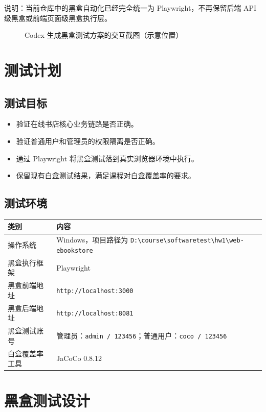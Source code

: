 \documentclass[UTF8,a4paper,12pt]{ctexart}
\begin{document}
说明：当前仓库中的黑盒自动化已经完全统一为 Playwright，不再保留后端 API 级黑盒或前端页面级黑盒执行层。

\begin{figure}[H]
  \centering
  \caption{Codex 生成黑盒测试方案的交互截图（示意位置）}
\end{figure}

\section{测试计划}

\subsection{测试目标}

\begin{itemize}
  \item 验证在线书店核心业务链路是否正确。
  \item 验证普通用户和管理员的权限隔离是否正确。
  \item 通过 Playwright 将黑盒测试落到真实浏览器环境中执行。
  \item 保留现有白盒测试结果，满足课程对白盒覆盖率的要求。
\end{itemize}

\subsection{测试环境}

\begin{longtable}{p{4cm}p{10cm}}
\toprule
类别 & 内容 \\
\midrule
操作系统 & Windows，项目路径为 \texttt{D:\textbackslash course\textbackslash softwaretest\textbackslash hw1\textbackslash web-ebookstore} \\
黑盒执行框架 & Playwright \\
黑盒前端地址 & \texttt{http://localhost:3000} \\
黑盒后端地址 & \texttt{http://localhost:8081} \\
黑盒测试账号 & 管理员：\texttt{admin / 123456}；普通用户：\texttt{coco / 123456} \\
白盒覆盖率工具 & JaCoCo 0.8.12 \\
\bottomrule
\end{longtable}

\section{黑盒测试设计}
\end{document}
